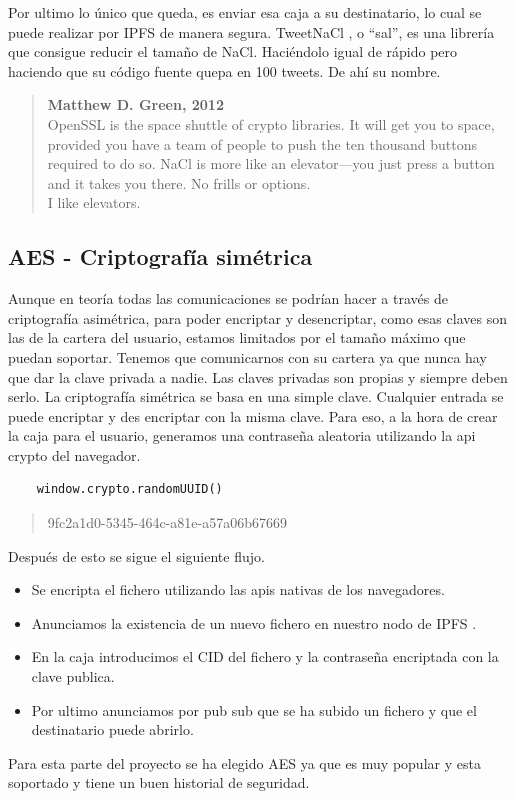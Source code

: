 Por ultimo lo único que queda, es enviar esa caja a su destinatario, lo cual se puede realizar por IPFS \cite{web:ipfs} de manera segura.
TweetNaCl \cite{web:tweetnacl}, o “sal”, es una librería que consigue reducir el tamaño de NaCl. Haciéndolo igual de rápido pero haciendo que su código fuente quepa en 100 tweets. De ahí su nombre.
\begin{quote}
    \textbf{Matthew D. Green, 2012}\\
    OpenSSL is the space shuttle of crypto libraries. It will get you to space, provided you have a team of people to push the ten thousand buttons required to do so. NaCl is more like an elevator—you just press a button and it takes you there. No frills or options.\\
    I like elevators. \cite{web:tweetnacl_elevator}
\end{quote}
\subsection{AES - Criptografía simétrica}
Aunque en teoría todas las comunicaciones se podrían hacer a través de criptografía asimétrica, para poder encriptar y desencriptar, como esas claves son las de la cartera del usuario, estamos limitados por el tamaño máximo que puedan soportar. Tenemos que comunicarnos con su cartera ya que nunca hay que dar la clave privada a nadie. Las claves privadas son propias y siempre deben serlo.
La criptografía simétrica se basa en una simple clave. Cualquier entrada se puede encriptar y des encriptar con la misma clave. Para eso, a la hora de crear la caja para el usuario, generamos una contraseña aleatoria utilizando la api crypto del navegador.
\begin{lstlisting}
    window.crypto.randomUUID()
\end{lstlisting}
\begin{quote}
    9fc2a1d0-5345-464c-a81e-a57a06b67669
\end{quote}
Después de esto se sigue el siguiente flujo.
\begin{itemize}
    \item Se encripta el fichero utilizando las apis nativas de los navegadores.
    \item Anunciamos la existencia de un nuevo fichero en nuestro nodo de IPFS \cite{web:ipfs}.
    \item En la caja introducimos el CID del fichero y la contraseña encriptada con la clave publica.
    \item Por ultimo anunciamos por pub sub que se ha subido un fichero y que el destinatario puede abrirlo.
\end{itemize}
Para esta parte del proyecto se ha elegido AES ya que es muy popular y esta soportado y tiene un buen historial de seguridad.
\newpage
\thispagestyle{empty}